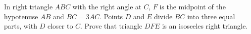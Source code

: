 In right triangle $ABC$ with the right angle at $C$, $F$ is the midpoint of the hypotenuse $AB$ and $BC=3AC$. Points $D$ and $E$ divide $BC$ into three equal parts, with $D$ closer to $C$. Prove that triangle $DFE$ is an isosceles right triangle.
